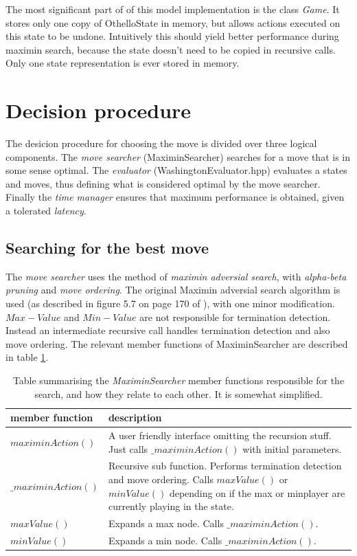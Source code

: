 \documentclass[a4paper,11pt]{article}
\begin{document}
The most significant part of of this model implementation is the class \textit{Game}. It stores only one copy of OthelloState in memory, but allows actions executed on this state to be undone. Intuitively this should yield better performance during maximin search, because the state doesn't need to be copied in recursive calls. Only one state representation is ever stored in memory.

\section{Decision procedure}
The desicion procedure for choosing the move is divided over three logical components. The \textit{move searcher} (MaximinSearcher) searches for a move that is in some sense optimal. The \textit{evaluator} (WashingtonEvaluator.hpp) evaluates a states and moves, thus defining what is considered optimal by the move searcher. Finally the \textit{time manager} ensures that maximum performance is obtained, given a tolerated \textit{latency}.

\subsection{Searching for the best move}
The \textit{move searcher} uses the method of \textit{maximin adversial search}, with \textit{alpha-beta pruning} and \textit{move ordering}. The original Maximin adversial search algorithm is used (as described in figure 5.7 on page 170 of \cite{aibook}), with one minor modification. $Max-Value$ and $Min-Value$ are not responsible for termination detection. Instead an intermediate recursive call handles termination detection and also move ordering. The relevant member functions of MaximinSearcher are described in table \ref{tab:maximinfunc}.

\begin{table}

\centering
\begin{tabular}{|l|p{12 cm}|}
\hline
\textbf{member function} & \textbf{description}
\\\hline
$maximinAction()$ & A user friendly interface omitting the recursion stuff. Just calls $\_maximinAction()$ with initial parameters.
\\ \hline
$\_maximinAction()$ & Recursive sub function. Performs termination detection and move ordering. Calls $maxValue()$ or $minValue()$ depending on if the max or minplayer are currently playing in the state.
\\ \hline
$maxValue()$ & Expands a max node. Calls $\_maximinAction()$.
\\ \hline
$minValue()$ & Expands a min node. Calls $\_maximinAction()$.
\\ \hline
\end{tabular}

\caption{Table summarising the \emph{MaximinSearcher} member functions responsible for the search, and how they relate to each other. It is somewhat simplified.} \label{tab:maximinfunc}

\end{table}
\end{document}
